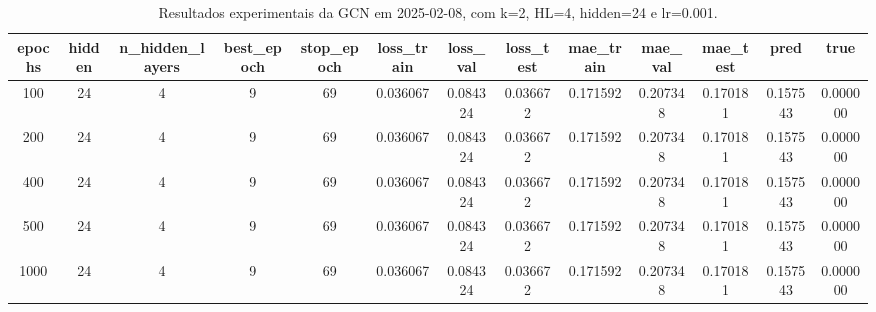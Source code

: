 \begin{table}[h]
\centering
\caption{Resultados experimentais da GCN em 2025-02-08, com k=2, HL=4, hidden=24 e lr=0.001.}
\label{tab:gcn_results_k2_hl4_h24_d20250208}
\begin{tabular}{ccccccccccccc}
\toprule
epochs & hidden & n\_hidden\_layers & best\_epoch & stop\_epoch & loss\_train & loss\_val & loss\_test & mae\_train & mae\_val & mae\_test & pred & true \\
\midrule
100 & 24 & 4 & 9 & 69 & 0.036067 & 0.084324 & 0.036672 & 0.171592 & 0.207348 & 0.170181 & 0.157543 & 0.000000 \\
200 & 24 & 4 & 9 & 69 & 0.036067 & 0.084324 & 0.036672 & 0.171592 & 0.207348 & 0.170181 & 0.157543 & 0.000000 \\
400 & 24 & 4 & 9 & 69 & 0.036067 & 0.084324 & 0.036672 & 0.171592 & 0.207348 & 0.170181 & 0.157543 & 0.000000 \\
500 & 24 & 4 & 9 & 69 & 0.036067 & 0.084324 & 0.036672 & 0.171592 & 0.207348 & 0.170181 & 0.157543 & 0.000000 \\
1000 & 24 & 4 & 9 & 69 & 0.036067 & 0.084324 & 0.036672 & 0.171592 & 0.207348 & 0.170181 & 0.157543 & 0.000000 \\
\bottomrule
\end{tabular}
\end{table}
